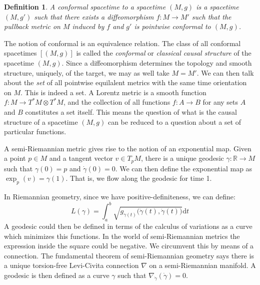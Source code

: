 \documentclass{article}
\theoremstyle{plain}
\theoremstyle{thmit}
\theoremstyle{normal}
\newtheorem{definition}{Definition}[section]
\begin{document}
        \begin{definition}
            A conformal spacetime to a spacetime $(M,g)$ is a spacetime $(M,g')$
            such that there exists a diffeomorphism $f:M\rightarrow{M}'$ such
            that the pullback metric on $M$ induced by $f$ and $g'$ is
            pointwise conformal to $(M,g)$.
        \end{definition}
        The notion of conformal is an equivalence relation. The class of all
        conformal spacetimes $[(M,g)]$ is called the \textit{conformal} or
        \textit{classical causal structure} of the spacetime $(M,g)$. Since a
        diffeomorphism determines the topology and smooth structure, uniquely,
        of the target, we may as well take $M=M'$. We can then talk about the
        \textit{set} of all pointwise equilalent metrics with the same time
        orientation on $M$. This is indeed a set. A Lorentz metric is a smooth
        function $f:M\rightarrow{T}^{*}M\otimes{T}^{*}M$, and the collection of
        all functions $f:A\rightarrow{B}$ for any sets $A$ and $B$ constitutes
        a set itself. This means the question of what is the causal structure
        of a spacetime $(M,g)$ can be reduced to a question about a set of
        particular functions.
        \par\hfill\par
        A semi-Riemannian metric gives rise to the notion of an exponential
        map. Given a point $p\in{M}$ and a tangent vector $v\in{T}_{p}M$, there
        is a unique geodesic $\gamma:\mathbb{R}\rightarrow{M}$ such that
        $\gamma(0)=p$ and $\dot{\gamma}(0)=0$. We can then define the
        exponential map as $\exp_{p}(v)=\gamma(1)$. That is, we flow along the
        geodesic for time 1.
        \par\hfill\par
        In Riemannian geometry, since we have positive-definiteness, we can
        define:
        \begin{equation}
            L(\gamma)=\int_{a}^{b}
                \sqrt{g_{\gamma(t)}\big(
                    \dot{\gamma}(t),\dot{\gamma}(t)
                \big)}\textrm{d}t
        \end{equation}
        A geodesic could then be defined in terms of the calculus of variations
        as a curve which minimizes this functions. In the world of
        semi-Riemannian metrics the expression inside the square could be
        negative. We circumvent this by means of a connection. The fundamental
        theorem of semi-Riemannian geometry says there is a unique torsion-free
        Levi-Civita connection $\nabla$ on a semi-Riemannian manifold. A
        geodesic is then defined as a curve $\gamma$ such that
        $\nabla_{\dot{\gamma}}(\dot{\gamma})=0$.
\end{document}

